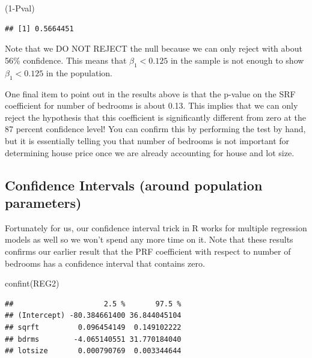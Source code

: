 \documentclass[
]{book}
\newenvironment{Shaded}{\begin{snugshade}}{\end{snugshade}}
\newcommand{\DecValTok}[1]{\textcolor[rgb]{0.00,0.00,0.81}{#1}}
\newcommand{\FunctionTok}[1]{\textcolor[rgb]{0.00,0.00,0.00}{#1}}
\newcommand{\NormalTok}[1]{#1}
\newcommand{\SpecialCharTok}[1]{\textcolor[rgb]{0.00,0.00,0.00}{#1}}
\begin{document}
\begin{Shaded}
\begin{Highlighting}[]
\NormalTok{(}\DecValTok{1}\SpecialCharTok{{-}}\NormalTok{Pval)}
\end{Highlighting}
\end{Shaded}

\begin{verbatim}
## [1] 0.5664451
\end{verbatim}

Note that we DO NOT REJECT the null because we can only reject with about 56\% confidence. This means that \(\hat{\beta}_1 < 0.125\) in the sample is not enough to show \(\beta_1 < 0.125\) in the population.

One final item to point out in the results above is that the p-value on the SRF coefficient for number of bedrooms is about 0.13. This implies that we can only reject the hypothesis that this coefficient is significantly different from zero at the 87 percent confidence level! You can confirm this by performing the test by hand, but it is essentially telling you that number of bedrooms is not important for determining house price once we are already accounting for house and lot size.

\hypertarget{confidence-intervals-around-population-parameters-1}{%
\subsection{Confidence Intervals (around population parameters)}\label{confidence-intervals-around-population-parameters-1}}

Fortunately for us, our confidence interval trick in R works for multiple regression models as well so we won't spend any more time on it. Note that these results confirms our earlier result that the PRF coefficient with respect to number of bedrooms has a confidence interval that contains zero.

\begin{Shaded}
\begin{Highlighting}[]
\FunctionTok{confint}\NormalTok{(REG2)}
\end{Highlighting}
\end{Shaded}

\begin{verbatim}
##                     2.5 %       97.5 %
## (Intercept) -80.384661400 36.844045104
## sqrft         0.096454149  0.149102222
## bdrms        -4.065140551 31.770184040
## lotsize       0.000790769  0.003344644
\end{verbatim}
\end{document}
